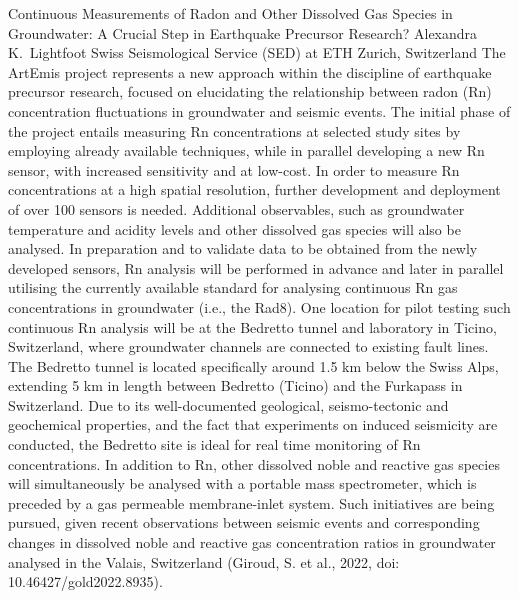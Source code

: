 \begin{conf-abstract}
{Continuous Measurements of Radon and Other Dissolved Gas Species in Groundwater: A Crucial Step in Earthquake Precursor Research?}
{Alexandra K.\ Lightfoot}
{Swiss Seismological Service (SED) at ETH Zurich, Switzerland}
{The ArtEmis project represents a new approach within the discipline of earthquake precursor research, focused on elucidating the relationship between radon (Rn) concentration fluctuations in groundwater and seismic events. The initial phase of the project entails measuring Rn concentrations at selected study sites by employing already available techniques, while in parallel developing a new Rn sensor, with increased sensitivity and at low-cost. In order to measure Rn concentrations at a high spatial resolution, further development and deployment of over 100 sensors is needed. Additional observables, such as groundwater temperature and acidity levels and other dissolved gas species will also be analysed. 
In preparation and to validate data to be obtained from the newly developed sensors, Rn analysis will be performed in advance and later in parallel utilising the currently available standard for analysing continuous Rn gas concentrations in groundwater (i.e., the Rad8). One location for pilot testing such continuous Rn analysis will be at the Bedretto tunnel and laboratory in Ticino, Switzerland, where groundwater channels are connected to existing fault lines. The Bedretto tunnel is located specifically around 1.5 km below the Swiss Alps, extending 5 km in length between Bedretto (Ticino) and the Furkapass in Switzerland. Due to its well-documented geological, seismo-tectonic and geochemical properties, and the fact that experiments on induced seismicity are conducted, the Bedretto site is ideal for real time monitoring of Rn concentrations. 
In addition to Rn, other dissolved noble and reactive gas species will simultaneously be analysed with a portable mass spectrometer, which is preceded by a gas permeable membrane-inlet system. Such initiatives are being pursued, given recent observations between seismic events and corresponding changes in dissolved noble and reactive gas concentration ratios in groundwater analysed in the Valais, Switzerland (Giroud, S. et al., 2022, doi: 10.46427/gold2022.8935).}
\end{conf-abstract}
